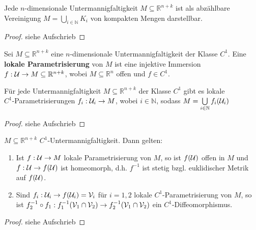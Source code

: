 
  \begin{theorem}
    Jede $n$-dimensionale Untermannigfaltigkeit $M \subseteq \mathbb{R}^{n+k}$ ist als abzählbare Vereinigung $M = \bigcup\limits_{i\in\mathbb{N}} K_i$ von kompakten Mengen darstellbar.
  \end{theorem}
  \begin{proof}
    siehe Aufschrieb
  \end{proof}

  \begin{definition}
    Sei $M \subseteq \mathbb{R}^{n+k}$ eine $n$-dimensionale Untermannigfaltigkeit der Klasse $C^1$. Eine \textbf{lokale Parametrisierung} von $M$ ist eine injektive Immersion $f: \mathcal{U} \to M \subseteq \mathbb{R}^{n+k}$, wobei $M \subseteq \mathbb{R}^n$ offen und $f \in C^1$.
  \end{definition}

  \begin{lemma}
    Für jede Untermannigfaltigkeit $M \subseteq \mathbb{R}^{n+k}$ der Klasse $C^1$ gibt es lokale\\
    $C^1$-Parametrisierungen $f_i:\mathcal{U}_i \to M$, wobei $i\in\mathbb{N}$, sodass $M = \bigcup\limits_{i \in \mathbb{N}} f_i(\mathcal{U}_i)$
  \end{lemma}
  \begin{proof}
    siehe Aufschrieb
  \end{proof}

  \begin{theorem}
    $M \subseteq \mathbb{R}^{n+k}$ $C^1$-Untermannigfaltigkeit. Dann gelten:
    \begin{enumerate}
      \item Ist $f: \mathcal{U} \to M$ lokale Parametrisierung von $M$, so ist $f(\mathcal{U})$ offen in $M$ und $f: \mathcal{U} \to f(\mathcal{U})$ ist homeomorph, d.h. $f^{-1}$ ist stetig bzgl. euklidischer Metrik auf $f(\mathcal{U})$.
      \item Sind $f_i:\mathcal{U}_i \to f(\mathcal{U}_i) = \mathcal{V}_i$ für $i = 1,2$ lokale $C^1$-Parametrisierung von $M$, so ist $f_2^{-1}\circ f_1: f_1^{-1}(\mathcal{V}_1\cap\mathcal{V}_2) \to f_2^{-1}(\mathcal{V}_1\cap\mathcal{V}_2)$ ein $C^1$-Diffeomorphismus. 
    \end{enumerate}
  \end{theorem}
  \begin{proof}
    siehe Aufschrieb
  \end{proof}

